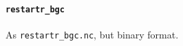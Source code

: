 \documentclass[11pt,a4paper,fleqn,twoside]{article}
\begin{document}
\paragraph{\tt restartr\_bgc} As {\tt restartr\_bgc.nc}, but binary format.




\end{document}
